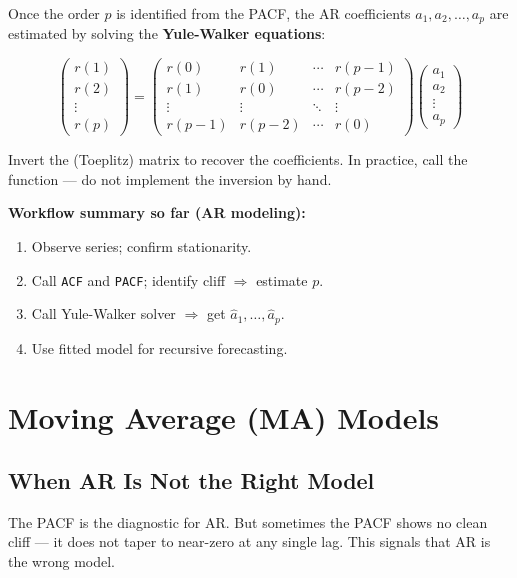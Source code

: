 \documentclass[11pt]{article}
\begin{document}
Once the order $p$ is identified from the PACF, the AR coefficients
$a_1, a_2, \ldots, a_p$ are estimated by solving the \textbf{Yule-Walker
equations}:

\[
\begin{pmatrix} r(1) \\ r(2) \\ \vdots \\ r(p) \end{pmatrix}
=
\begin{pmatrix}
  r(0)   & r(1)   & \cdots & r(p-1) \\
  r(1)   & r(0)   & \cdots & r(p-2) \\
  \vdots & \vdots & \ddots & \vdots \\
  r(p-1) & r(p-2) & \cdots & r(0)
\end{pmatrix}
\begin{pmatrix} a_1 \\ a_2 \\ \vdots \\ a_p \end{pmatrix}
\]

Invert the (Toeplitz) matrix to recover the coefficients. In practice, call
the function --- do not implement the inversion by hand.

\textbf{Workflow summary so far (AR modeling):}
\begin{enumerate}
    \item Observe series; confirm stationarity.
    \item Call \texttt{ACF} and \texttt{PACF}; identify cliff $\Rightarrow$
      estimate $p$.
    \item Call Yule-Walker solver $\Rightarrow$ get $\hat{a}_1, \ldots,
      \hat{a}_p$.
    \item Use fitted model for recursive forecasting.
\end{enumerate}


\section{Moving Average (MA) Models}

\subsection{When AR Is Not the Right Model}
The PACF is the diagnostic for AR. But sometimes the PACF shows no clean
cliff --- it does not taper to near-zero at any single lag. This signals
that AR is the wrong model.
\end{document}
